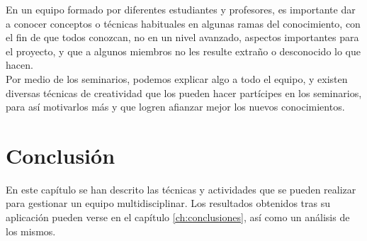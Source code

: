 En un equipo formado por diferentes estudiantes y profesores, es importante dar a conocer conceptos o técnicas habituales en algunas ramas del conocimiento, con el fin de que todos conozcan, no en un nivel avanzado, aspectos importantes para el proyecto, y que a algunos miembros no les resulte extraño o desconocido lo que hacen.\\

Por medio de los seminarios, podemos explicar algo a todo el equipo, y existen diversas técnicas de creatividad que los pueden hacer partícipes en los seminarios, para así motivarlos más y que logren afianzar mejor los nuevos conocimientos.

\section{Conclusión}
En este capítulo se han descrito las técnicas y actividades que se pueden realizar para gestionar un equipo multidisciplinar. Los resultados obtenidos tras su aplicación pueden verse en el capítulo \ref{ch:conclusiones}, así como un análisis de los mismos.
